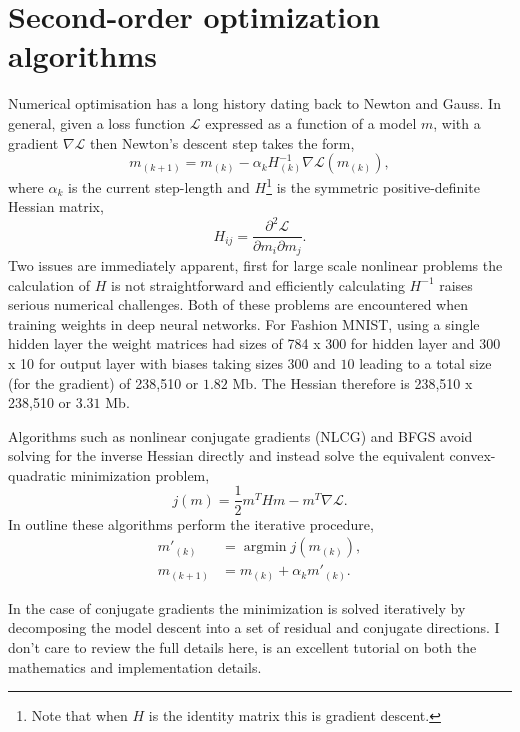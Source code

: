 \documentclass[nohyperref]{article}
\theoremstyle{plain}
\theoremstyle{definition}
\theoremstyle{remark}
\DeclareMathOperator*{\argmin}{argmin}
\begin{document}
\section{Second-order optimization algorithms}\label{sec:optim}
Numerical optimisation \citep[see][]{Nocedal:Wright} has a long history dating back to Newton and Gauss. In general, given a loss function $\mathcal{L}$ expressed as a function of a model $m$, with a gradient $\nabla \mathcal{L}$ then Newton's descent step takes the form,
\begin{equation}
m_{(k+1)}=m_{(k)}- \alpha_{k} H_{(k)}^{-1} \nabla \mathcal{L}(m_{(k)}),
\end{equation}
where $\alpha_k$ is the current step-length and $H$\footnote{Note that when $H$ is the identity matrix this is gradient descent.} is the symmetric positive-definite Hessian matrix,
\begin{equation}
H_{ij}=\frac{\partial^2 \mathcal{L}}{\partial m_i \partial m_j}.
\end{equation}
Two issues are immediately apparent, first for large scale nonlinear problems the calculation of $H$ is not straightforward and efficiently calculating $H^{-1}$ raises serious numerical challenges. Both of these problems are encountered when training weights in deep neural networks. For Fashion MNIST, using a single hidden layer the weight matrices had sizes of 784 x 300 for hidden layer and 300 x 10 for output layer with biases taking sizes $300$ and $10$ leading to a total size (for the gradient) of 238,510 or $1.82$ Mb. The Hessian therefore is 238,510 x 238,510 or $3.31$ Mb. 

Algorithms such as nonlinear conjugate gradients (NLCG) and BFGS avoid solving for the inverse Hessian directly and instead solve the equivalent convex-quadratic minimization problem, 
\begin{equation}
j(m)=\frac{1}{2}m^THm-m^T\nabla \mathcal{L}.\label{my_obj}
\end{equation}   
In outline these algorithms perform the iterative procedure, 
\begin{align}
m'_{(k)}&=\argmin{j(m_{(k)})},\\
m_{(k+1)}&=m_{(k)}+\alpha_{k} m'_{(k)}.
\end{align}

In the case of conjugate gradients the minimization is solved iteratively by  decomposing the model descent into a set of residual and conjugate directions. I don't care to review the full details here, \citet{Shew:CGnopain} is an excellent tutorial on both the mathematics and implementation details.
\end{document}
